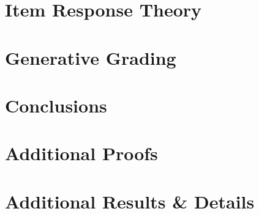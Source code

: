 \documentclass[12pt,letterpaper]{report}
\begin{document}
\chapter{Item Response Theory}
\label{chapter:vibo}


\chapter{Generative Grading}
\label{chapter:ggnap}


\chapter{Conclusions}
\label{chapter:conclusion}


\printbibliography

\begin{appendices}
    \chapter{Additional Proofs}
    \label{chapter:appendix:proof}
    
    
    \chapter{Additional Results \& Details}
    \label{chapter:appendix:results}
    
\end{appendices}
\end{document}
